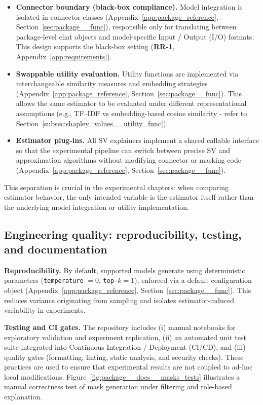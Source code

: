 \begin{itemize}
    \item \textbf{Connector boundary (black-box compliance).} Model integration is isolated in connector classes (Appendix~\ref{app:package_reference}, Section~\ref{sec:package__func}), responsible only for translating between package-level chat objects and model-specific Input / Output (I/O) formats. This design supports the black-box setting (\textbf{RR-1}, Appendix~\ref{app:requirements}).
    \item \textbf{Swappable utility evaluation.} Utility functions are implemented via interchangeable similarity measures and embedding strategies (Appendix~\ref{app:package_reference}, Section~\ref{sec:package__func}). This allows the same estimator to be evaluated under different representational assumptions (e.g., TF--IDF vs embedding-based cosine similarity - refer to Section~\ref{subsec:shapley_values__utility_func}).
    \item \textbf{Estimator plug-ins.} All SV explainers implement a shared callable interface so that the experimental pipeline can switch between precise SV and approximation algorithms without modifying connector or masking code (Appendix~\ref{app:package_reference}, Section~\ref{sec:package__func}).
\end{itemize}

This separation is crucial in the experimental chapters: when comparing estimator behavior, the only intended variable is the estimator itself rather than the underlying model integration or utility implementation.

\subsection{Engineering quality: reproducibility, testing, and documentation}
\label{sec:package__quality}

\textbf{Reproducibility.} By default, supported models generate using deterministic parameters (\texttt{temperature} $=0$, \texttt{top-}$k=1$), enforced via a default configuration object (Appendix~\ref{app:package_reference}, Section~\ref{sec:package__func}). This reduces variance originating from sampling and isolates estimator-induced variability in experiments.

\textbf{Testing and CI gates.} The repository includes (i) manual notebooks for exploratory validation and experiment replication, (ii) an automated unit test suite integrated into Continuous Integration / Deployment (CI/CD), and (iii) quality gates (formatting, linting, static analysis, and security checks). These practices are used to ensure that experimental results are not coupled to ad-hoc local modifications. Figure~\ref{fig:package__docs__masks_tests} illustrates a manual correctness test of mask generation under filtering and role-based explanation.

